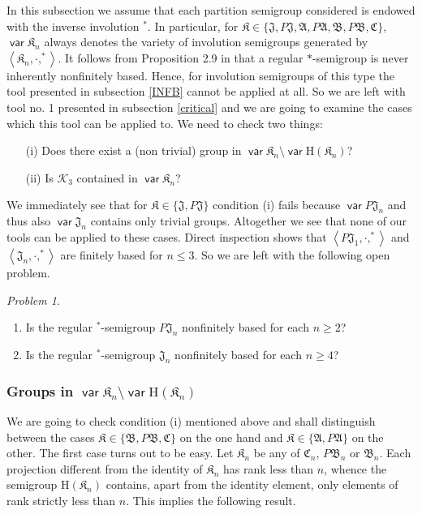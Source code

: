 \documentclass[preprint,1p,times]{elsarticle}
\DeclareMathOperator{\var}{\mathsf{var}}
\numberwithin{equation}{section}
\theoremstyle{remark}
\newtheorem{Problem}{Problem}[section]
\def\cal{\mathcal}
\def\Kc{{\cal K}}
\def\H{\mathrm H}
\def\A{\mathfrak{A}}
\def\C{\mathfrak{C}}
\def\B{\mathfrak{B}}
\def\J{\mathfrak{J}}
\def\K{\mathfrak{K}}
\begin{document}
In this subsection we assume that each partition semigroup considered is endowed with the inverse involution  $^*$. In
particular, for $\K\in \{\J,P\J,\A,P\A,\B,P\B,\C\}$, $\var \K_n$ always denotes the variety of involution semigroups
generated by $\left<\K_n,\cdot,^*\right>$. It follows from Proposition 2.9 in \cite{adv} that a regular $*$-semigroup
is never inherently nonfinitely based. Hence, for involution semigroups of this type the tool presented in subsection
\ref{INFB} cannot be applied at all. So we are left with tool no. 1 presented in subsection \ref{critical} and we are
going to examine the cases which this tool can be applied to. We need to check two things:
\begin{enumerate}
\item[(i)] Does there exist a (non trivial) group in $\var\K_n\setminus \var\H(\K_n)$?
\item[(ii)] Is $\Kc_3$ contained in $\var\K_n$?
\end{enumerate}
We immediately see that for $\K\in\{\J,P\J\}$ condition (i) fails because  $\var P\J_n$ and thus also $\var\J_n$
contains only trivial groups. Altogether we see that none of our tools can be applied to these cases. Direct inspection
shows that $\left<P\J_1,\cdot,^*\right>$ and $\left<\J_n,\cdot,^*\right>$ are finitely based for $n\le 3$. So we are
left with the following open problem.
\begin{Problem}
\begin{enumerate}
\item Is the regular $^*$-semigroup $P\J_n$ nonfinitely based for each $n\ge 2$?
\item Is the regular $^*$-semigroup $\J_n$ nonfinitely based for each $n\ge 4$?
\end{enumerate}
\end{Problem}

\subsubsection{Groups in $\var\K_n\setminus\var\H(\K_n)$}

We are going to check condition (i) mentioned above and shall distinguish between the cases $\K\in \{\B,P\B,\C\}$ on
the one hand and $\K\in\{\A,P\A\}$ on the other. The first case turns out to be easy. Let $\mathfrak{K}_n$ be any of
$\C_n$, $P\B_n$ or $\B_n$. Each projection different from the identity of $\mathfrak{K}_n$ has rank less than $n$,
whence the semigroup $\H(\mathfrak{K}_n)$ contains, apart from the identity element, only elements of rank strictly
less than $n$. This implies the following result.
\end{document}
